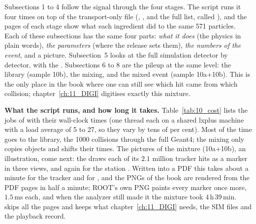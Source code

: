 Subsections 1 to 4 follow the signal through the four stages. The script runs it four times on top of the
transport-only file (, ,  and the full list, called ), and the
 pages of each stage show what each ingredient did to the same 571 particles. Each of these
subsections has the same four parts: \emph{what it does} (the physics in plain words), \emph{the parameters} (where
the release sets them), \emph{the numbers of the event}, and a picture. Subsection~5 looks at the full simulation
detector by detector, with the . Subsections 6 to 8 are the pileup at the same level: the
library (sample 10b), the mixing, and the mixed event (sample 10a+10b). This is the only place in the book where one
can still see which hit came from which collision; chapter~\ref{ch:11_DIGI} digitises exactly this mixture.

\textbf{What the script runs, and how long it takes.} Table~\ref{tab:10_cost} lists the jobs of
 with their wall-clock times (one thread each on a shared lxplus machine with a load
average of 5 to 27, so they vary by tens of per cent). Most of the time goes to the library, the 1000 collisions
through the full Geant4; the mixing only copies objects and shifts their times. The pictures of the mixture (10a+10b),
an illustration, come next: the  draws each of its $2.1$ million tracker hits as a marker in three
views, and again for the station . Written into a PDF this takes about a minute for the tracker and for
, and the PNGs of the book are rendered from the PDF pages in half a minute; ROOT's own PNG paints every marker once more, $1.5$\,ms each,
and when the analyzer still made it the mixture took 4\,h\,39\,min.  skips all the pages and keeps what
chapter~\ref{ch:11_DIGI} needs, the SIM files and the playback record.

